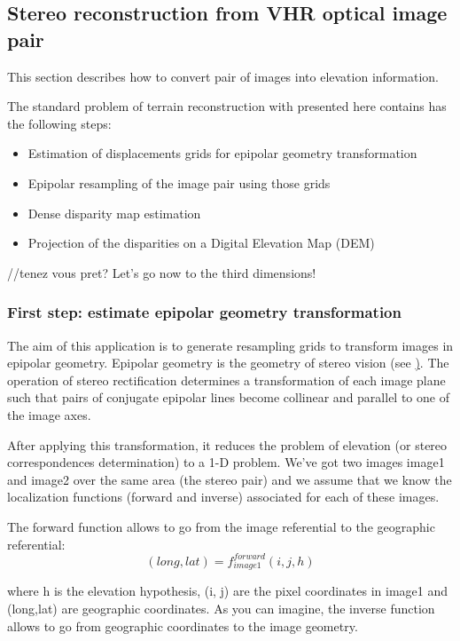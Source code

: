 \subsection{Stereo reconstruction from VHR optical image pair}\label{sec:stereoreconstruction}

This section describes how to convert pair of images into elevation information.

The standard problem of terrain reconstruction with \app presented here contains
has the following steps:

\begin{itemize}
\item Estimation of displacements grids for epipolar geometry transformation
\item Epipolar resampling of the image pair using those grids
\item Dense disparity map estimation
\item Projection of the disparities on a Digital Elevation Map (DEM)
\end{itemize}

//tenez vous pret?
Let's go now to the third dimensions!

\subsubsection{First step: estimate epipolar geometry transformation}\label{ssec:epipolar}
The aim of this application is to generate resampling grids to transform images
in epipolar geometry.  Epipolar geometry is the geometry of stereo vision (see
\href{http://en.wikipedia.org/wiki/Epipolar_geometry}). The operation of stereo
rectification determines a transformation of each image plane such that pairs of
conjugate epipolar lines become collinear and parallel to one of the image axes.

After applying this transformation, it reduces the problem of elevation (or
stereo correspondences determination) to a 1-D problem.  We've got two images
image1 and image2 over the same area (the stereo pair) and we assume that we
know the localization functions (forward and inverse) associated for each of
these images.

The forward function allows to go from the image referential to the geographic
referential:
\begin{equation}
  (long,lat) = f^{forward}_{image1}(i,j,h)
\end{equation}

where h is the elevation hypothesis, (i, j) are the pixel coordinates in image1
and (long,lat) are geographic coordinates.  As you can imagine, the inverse
function allows to go from geographic coordinates to the image geometry.


